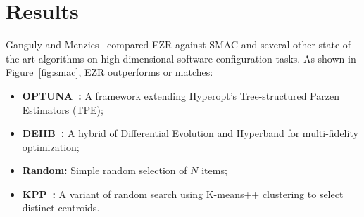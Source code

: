 \documentclass[runningheads]{llncs}
\begin{document}
\section{Results}
Ganguly and Menzies~\cite{datalite} compared EZR against SMAC and
several other state-of-the-art algorithms on high-dimensional
software configuration tasks. As shown in Figure~\ref{fig:smac}, EZR
outperforms or matches:
\begin{itemize}
    \item \textbf{OPTUNA~\cite{akiba2019optuna}:} A framework
    extending Hyperopt's Tree-structured Parzen Estimators (TPE);
    \item \textbf{DEHB~\cite{awad2021dehb}:} A hybrid of Differential
    Evolution and Hyperband for multi-fidelity optimization;
    \item \textbf{Random:} Simple random selection of $N$ items;
    \item \textbf{KPP~\cite{Arthur2007}:} A variant of random search
    using K-means++ clustering to select distinct centroids.
\end{itemize}
\end{document}
